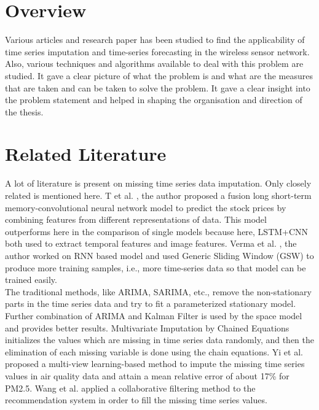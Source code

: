 \section{Overview}

Various articles and research paper has been studied to find the applicability of time series imputation and time-series forecasting in the wireless sensor network. Also, various techniques and algorithms available to deal with this problem are studied. It gave a clear picture of what the problem is and what are the measures that are taken and can be taken to solve the problem. It gave a clear insight into the problem statement and helped in shaping the organisation and direction of the thesis.

\section{Related Literature}


A lot of literature is present on missing time series data imputation. Only closely related is mentioned here.
T et al. \cite{21}, the author proposed a fusion long short-term memory-convolutional neural network model to predict the stock prices by combining features from different representations of data. This model outperforms here in the comparison of single models because here, LSTM+CNN both used to extract temporal features and image features.\cite{22} Verma et al. \cite{23}, the author worked on RNN based model and used Generic Sliding Window (GSW) to produce more training samples, i.e., more time-series data so that model can be trained easily. 
\\

The traditional methods, like ARIMA, SARIMA, etc., remove the non-stationary parts in the time series data and try to fit a parameterized stationary model. Further combination of ARIMA and Kalman Filter \cite{24, 25} is used by the space model and provides better results. Multivariate Imputation by Chained Equations \cite{26} initializes the values which are missing in time series data randomly, and then the elimination of each missing variable is done using the chain equations. Yi et al. \cite{27} proposed a multi-view learning-based method to impute the missing time series values in air quality data and attain a mean relative error of about 17\% for PM2.5. Wang et al. \cite{28} applied a collaborative filtering method to the recommendation system in order to fill the missing time series values. 
\\

